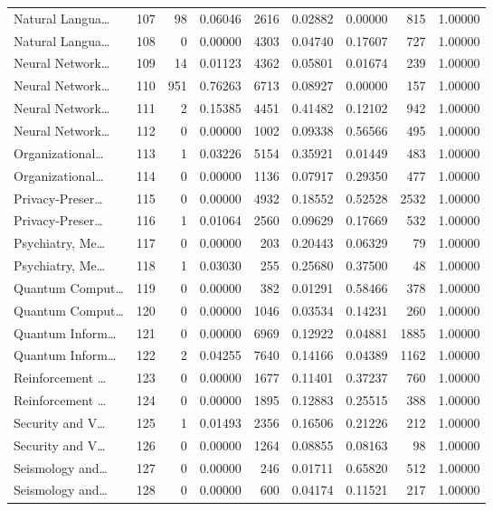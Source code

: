\begin{table}
\begin{tabular}{lrrrrrrrr}
Natural Langua… & 107 & 98 & 0.06046 & 2616 & 0.02882 & 0.00000 & 815 & 1.00000 \\
Natural Langua… & 108 & 0 & 0.00000 & 4303 & 0.04740 & 0.17607 & 727 & 1.00000 \\
Neural Network… & 109 & 14 & 0.01123 & 4362 & 0.05801 & 0.01674 & 239 & 1.00000 \\
Neural Network… & 110 & 951 & 0.76263 & 6713 & 0.08927 & 0.00000 & 157 & 1.00000 \\
Neural Network… & 111 & 2 & 0.15385 & 4451 & 0.41482 & 0.12102 & 942 & 1.00000 \\
Neural Network… & 112 & 0 & 0.00000 & 1002 & 0.09338 & 0.56566 & 495 & 1.00000 \\
Organizational… & 113 & 1 & 0.03226 & 5154 & 0.35921 & 0.01449 & 483 & 1.00000 \\
Organizational… & 114 & 0 & 0.00000 & 1136 & 0.07917 & 0.29350 & 477 & 1.00000 \\
Privacy-Preser… & 115 & 0 & 0.00000 & 4932 & 0.18552 & 0.52528 & 2532 & 1.00000 \\
Privacy-Preser… & 116 & 1 & 0.01064 & 2560 & 0.09629 & 0.17669 & 532 & 1.00000 \\
Psychiatry, Me… & 117 & 0 & 0.00000 & 203 & 0.20443 & 0.06329 & 79 & 1.00000 \\
Psychiatry, Me… & 118 & 1 & 0.03030 & 255 & 0.25680 & 0.37500 & 48 & 1.00000 \\
Quantum Comput… & 119 & 0 & 0.00000 & 382 & 0.01291 & 0.58466 & 378 & 1.00000 \\
Quantum Comput… & 120 & 0 & 0.00000 & 1046 & 0.03534 & 0.14231 & 260 & 1.00000 \\
Quantum Inform… & 121 & 0 & 0.00000 & 6969 & 0.12922 & 0.04881 & 1885 & 1.00000 \\
Quantum Inform… & 122 & 2 & 0.04255 & 7640 & 0.14166 & 0.04389 & 1162 & 1.00000 \\
Reinforcement … & 123 & 0 & 0.00000 & 1677 & 0.11401 & 0.37237 & 760 & 1.00000 \\
Reinforcement … & 124 & 0 & 0.00000 & 1895 & 0.12883 & 0.25515 & 388 & 1.00000 \\
Security and V… & 125 & 1 & 0.01493 & 2356 & 0.16506 & 0.21226 & 212 & 1.00000 \\
Security and V… & 126 & 0 & 0.00000 & 1264 & 0.08855 & 0.08163 & 98 & 1.00000 \\
Seismology and… & 127 & 0 & 0.00000 & 246 & 0.01711 & 0.65820 & 512 & 1.00000 \\
Seismology and… & 128 & 0 & 0.00000 & 600 & 0.04174 & 0.11521 & 217 & 1.00000 \\

\end{tabular}
\end{table}
